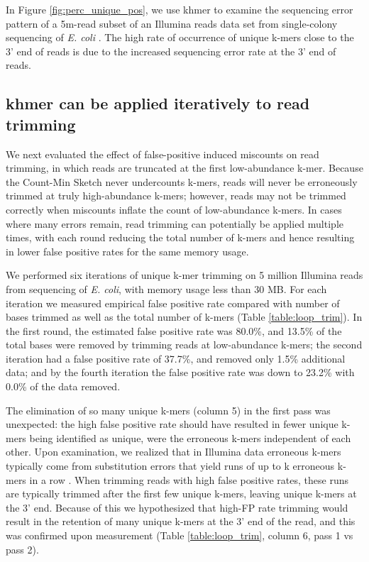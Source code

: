 \documentclass[10pt]{article}
\begin{document}
In Figure \ref{fig:perc_unique_pos}, we use khmer to examine the
sequencing error pattern of a 5m-read subset of an Illumina reads data
set from single-colony sequencing of {\em E. coli}
\cite{pubmed21926975}.  The high rate of occurrence of unique k-mers
close to the 3' end of reads is due to the increased sequencing error
rate at the 3' end of reads.

\subsection*{khmer can be applied iteratively to read trimming}

We next evaluated the effect of false-positive induced miscounts on
read trimming, in which reads are truncated at the first low-abundance
k-mer.  Because the Count-Min Sketch never undercounts k-mers, reads
will never be erroneously trimmed at truly high-abundance k-mers;
however, reads may not be trimmed correctly when miscounts inflate the
count of low-abundance k-mers.  In cases where many errors remain,
read trimming can potentially be applied multiple times, with each
round reducing the total number of k-mers and hence resulting in lower
false positive rates for the same memory usage.

We performed six iterations of unique k-mer trimming on 5 million
Illumina reads from sequencing of {\em E. coli}, with memory
usage less than 30 MB.  For each iteration we measured empirical false
positive rate compared with number of bases trimmed as well as the
total number of k-mers (Table \ref{table:loop_trim}).  In the first
round, the estimated false positive rate was 80.0\%, and 13.5\% of the
total bases were removed by trimming reads at low-abundance k-mers;
the second iteration had a false positive rate of 37.7\%, and removed
only 1.5\% additional data; and by the fourth iteration the false
positive rate was down to 23.2\% with 0.0\% of the data removed.

The elimination of so many unique k-mers (column 5) in the first pass
was unexpected: the high false positive rate should have resulted in
fewer unique k-mers being identified as unique, were the erroneous
k-mers independent of each other. Upon examination, we realized that
in Illumina data erroneous k-mers typically come from substitution
errors that yield runs of up to k erroneous k-mers in a row
\cite{Kelley2010}.  When trimming reads with high false positive
rates, these runs are typically trimmed after the first few unique
k-mers, leaving unique k-mers at the 3' end.  Because of this we
hypothesized that high-FP rate trimming would result in the retention
of many unique k-mers at the 3' end of the read, and this was
confirmed upon measurement (Table \ref{table:loop_trim}, column 6,
pass 1 vs pass 2).
\end{document}
